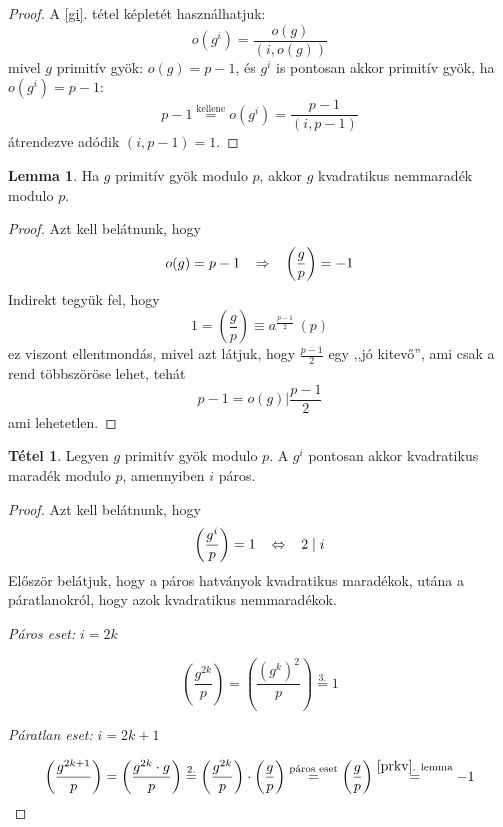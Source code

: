 \documentclass[12pt]{book}
\theoremstyle{plain} %
\theoremstyle{definition} %
\newtheorem{lem/}{Lemma}[section]
\newenvironment{lem}
  {\renewcommand{\qedsymbol}{$\clubsuit$}%
   \pushQED{\qed}\begin{lem/}}
  {\popQED\end{lem/}}
\newtheorem{theo/}{Tétel}[section]
\newenvironment{theo}
  {\renewcommand{\qedsymbol}{$\clubsuit$}%
   \pushQED{\qed}\begin{theo/}}
  {\popQED\end{theo/}}
\theoremstyle{remark}
\renewcommand\qedsymbol{$\blacksquare$}
\numberwithin{equation}{section}  %
\begin{document}
	\begin{proof}
		A \ref{gi}. tétel képletét használhatjuk:
		\[ o(g^i) = \dfrac{o(g)}{(i,o(g))}  \]
		mivel $g$ primitív gyök: $o(g)=p-1$, és $g^i$ is pontosan akkor primitív gyök, ha $o(g^i)=p-1$:
		\[ p-1 \stackrel{\text{kellene}}{=} o(g^i) =  \dfrac{p-1}{(i,p-1)}  \]
		átrendezve adódik $(i,p-1)=1$.
	\end{proof}
	
	\begin{lem}\label{prkv}
		Ha $g$ primitív gyök modulo $p$, akkor $g$ kvadratikus nemmaradék modulo $p$.
	\end{lem}

	\begin{proof}
		Azt kell belátnunk, hogy 
		\[ o(g)=p-1 \hspace{3mm} \Rightarrow  \hspace{3mm} \left(\dfrac{g}{p}\right) = -1 \]
		Indirekt tegyük fel, hogy
		\[1 = \left(\dfrac{g}{p}\right) \equiv a^{\frac{p-1}{2}}\ (p) \]
		ez viszont ellentmondás, mivel azt látjuk, hogy $\frac{p-1}{2}$ egy ,,jó kitevő'', ami csak a rend többszöröse lehet, tehát
		\[ p-1 = o(g) \mathrel{\bigg|} \dfrac{p-1}{2}  \]
		ami lehetetlen.
	\end{proof}

	\begin{theo}
		Legyen $g$ primitív gyök modulo $p$. A $g^i$ pontosan akkor kvadratikus maradék modulo $p$, amennyiben $i$ páros.
	\end{theo}

	\begin{proof}
		Azt kell belátnunk, hogy
		\[ \left(\dfrac{g^i}{p}\right) = 1 \hspace{3mm} \Leftrightarrow \hspace{3mm} 2\mid i \]
		Először belátjuk, hogy a páros hatványok kvadratikus maradékok, utána a páratlanokról, hogy azok kvadratikus nemmaradékok.
		
		\textit{Páros eset:} $i=2k$
		
		\[ \left(\dfrac{g^{2k}}{p}\right) = \left(\dfrac{(g^k)^2}{p}\right) \stackrel{3.}{=} 1 \]
		
		\textit{Páratlan eset:} $i=2k+1$
		
		\[ \left(\dfrac{g^{2k+1}}{p}\right) = \left(\dfrac{g^{2k}\cdot g}{p}\right) \stackrel{2.}{=} \left(\dfrac{g^{2k}}{p}\right) \cdot \left(\dfrac{g}{p}\right) \stackrel{\text{páros eset}}{=} \left(\dfrac{g}{p}\right) \stackrel{\ref{prkv}\text{. lemma}}{=} -1 \]
		
	\end{proof}
	
\end{document}
